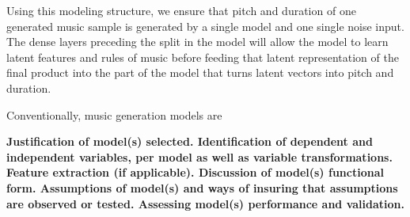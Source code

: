 \documentclass[12pt,oneside]{chicagocapstone}
\begin{document}
Using this modeling structure, we ensure that pitch and duration of one generated music sample is generated by a single model and one single noise input. The dense layers preceding the split in the model will allow the model to learn latent features and rules of music before feeding that latent representation of the final product into the part of the model that turns latent vectors into pitch and duration.

Conventionally, music generation models are

\textbf{Justification of model(s) selected. Identification of dependent and independent variables, per model as well as variable transformations. Feature extraction (if applicable). Discussion of model(s) functional form. Assumptions of model(s) and ways of insuring that assumptions are observed or tested. Assessing model(s) performance and validation.}
\end{document}
